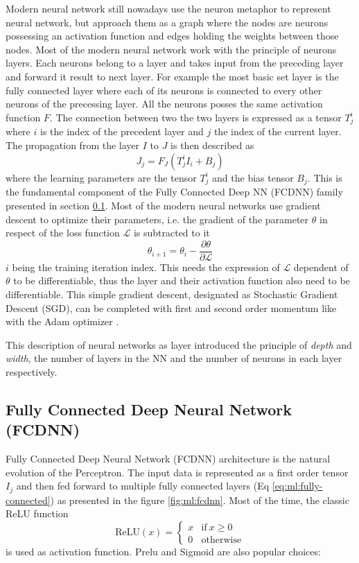 Modern neural network still nowadays use the neuron metaphor to represent neural network, but approach them as a graph where the nodes are neurons possessing an activation function and edges holding the weights between those nodes. Most of the modern neural network work with the principle of neurons layers. Each neurons belong to a layer and takes input from the preceding layer and forward it result to next layer. For example the most basic set layer is the fully connected layer where each of its neurons is connected to every other neurons of the precessing layer. All the neurons posses the same activation function $F$. The connection between two the two layers is expressed as a tensor $T^{i}_{j}$ where $i$ is the index of the precedent layer and $j$ the index of the current layer. The propagation from the layer $I$ to $J$ is then described as
\begin{equation}
  \label{eq:ml:fully-connected}
  J_{j} = F_J(T_{j}^{i} I_{i} + B_j)
\end{equation}
where the learning parameters are the tensor $T_j^i$ and the bias tensor $B_j$. This is the fundamental component of the Fully Connected Deep NN (FCDNN) family presented in section \ref{sec:ml:fcdnn}. Most of the modern neural networks use gradient descent to optimize their parameters, i.e. the gradient of the parameter $\theta$ in respect of the loss function $\mathcal{L}$ is subtracted to it
\begin{equation}
  \theta_{i+1} = \theta_i - \frac{\partial \theta}{\partial \mathcal{L}}
\end{equation}
$i$ being the training iteration index. This needs the expression of $\mathcal{L}$ dependent of $\theta$ to be differentiable, thus the layer and their activation function also need to be differentiable. This simple gradient descent, designated as Stochastic Gradient Descent (SGD), can be completed with first and second order momentum like with the Adam optimizer \cite{kingma_adam_2017}.

This description of neural networks as layer introduced the principle of \textit{depth} and \textit{width}, the number of layers in the NN and the number of neurons in each layer respectively.

\subsection{Fully Connected Deep Neural Network (FCDNN)}
\label{sec:ml:fcdnn}

Fully Connected Deep Neural Network (FCDNN) architecture is the natural evolution of the Perceptron. The input data is represented as a first order tensor $I_j$ and then fed forward to multiple fully connected layers (Eq \ref{eq:ml:fully-connected}) as presented in the figure \ref{fig:ml:fcdnn}. Most of the time, the classic ReLU function
\begin{equation}
  \label{sec:ml:relu}
  \mathrm{ReLU}(x) = \begin{cases}
    x & \mathrm{if} ~ x \geq 0 \\
    0 & \mathrm{otherwise}
  \end{cases}
\end{equation}
is used as activation function. Prelu and Sigmoid are also popular choices:


